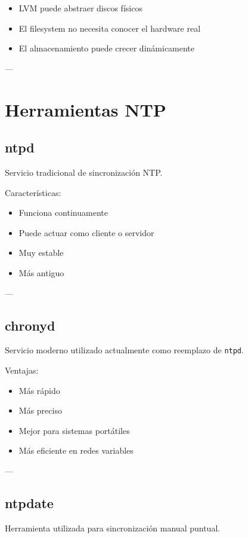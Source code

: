 \documentclass[11pt, letterpaper]{article}
\begin{document}
\begin{itemize}
\item LVM puede abstraer discos físicos
\item El filesystem no necesita conocer el hardware real
\item El almacenamiento puede crecer dinámicamente
\end{itemize}

---
\section{Herramientas NTP}
\label{sec:org46ad3c6}

\subsection{ntpd}
\label{sec:org385821e}

Servicio tradicional de sincronización NTP.

Características:

\begin{itemize}
\item Funciona continuamente
\item Puede actuar como cliente o servidor
\item Muy estable
\item Más antiguo
\end{itemize}

---
\subsection{chronyd}
\label{sec:org88ccfa7}

Servicio moderno utilizado actualmente como reemplazo de \texttt{ntpd}.

Ventajas:

\begin{itemize}
\item Más rápido
\item Más preciso
\item Mejor para sistemas portátiles
\item Más eficiente en redes variables
\end{itemize}

---
\subsection{ntpdate}
\label{sec:orga75ffac}

Herramienta utilizada para sincronización manual puntual.
\end{document}
